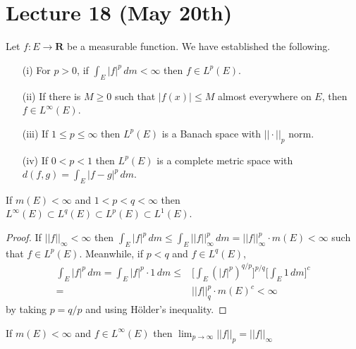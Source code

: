 \section{Lecture 18 (May 20th)}
\begin{rmk}
Let $f:E\rightarrow {\bm R}$ be a measurable function. We have established the following.
\begin{itemize}
\item[(i)] For $p>0$, if $\int _{E}|f|^{p}\,dm<\infty $ then $f\in L^{p}(E)$. 
\item[(ii)] If there is $M\geq 0$ such that $|f(x)|\leq M$ almost everywhere on $E$, then $f\in L^{\infty }(E)$.
\item[(iii)] If $1\leq p \leq \infty $ then $L^{p}(E)$ is a Banach space with $||\cdot ||_{p}$ norm.
\item[(iv)] If $0<p<1$ then $L^{p}(E)$ is a complete metric space with $d(f,g)=\int _{E}|f-g|^{p}\,dm$. 
\end{itemize}
\end{rmk}
\vspace{2ex}
\begin{thm}
If $m(E)<\infty $ and $1<p<q<\infty $ then $L^{\infty }(E)\subset L^{q}(E)\subset L^{p}(E)\subset L^{1}(E)$. 
\end{thm}
\vspace{2ex}
\begin{proof}
If $||f||_{\infty }<\infty $ then $\int _{E}|f|^{p}\,d m\leq \int _{E}||f||^{p}_{\infty }\,d m=||f||^{p}_{\infty }\cdot m(E)<\infty $ such that $f\in L^{p}(E)$. Meanwhile, if $p<q$ and $f\in L^{q}(E)$,
\begin{align*}
\int _{E}|f|^{p}\,d m=\int _{E}|f|^{p}\cdot 1\,d m\leq &\Big[\int _{E}(|f|^{p})^{q/p}\Big]^{p/q}\Big[\int _{E}1\,d m\Big]^{c}\\
=&||f||^{p}_{q}\cdot m(E)^{c}<\infty
\end{align*}
by taking $p=q/p$ and using H\"{o}lder's inequality.
\end{proof}
\vspace{2ex}
\begin{thm}
If $m(E)<\infty $ and $f\in L^{\infty }(E)$ then $\lim _{p\rightarrow \infty }||f||_{p}=||f||_{\infty }$
\end{thm}
\vspace{2ex}
